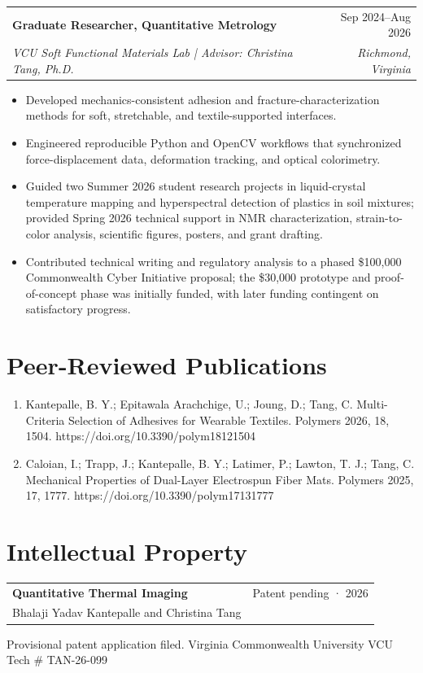 \documentclass[10pt,letterpaper]{article}
\makeatletter
\newcommand{\entry}[4]{%
  \begin{tabularx}{\textwidth}{@{}Xr@{}}
    {\bfseries\color{Ink} #1} & {\color{Muted}\small #2}\\
    {\itshape #3} & {\itshape\color{Muted}\small #4}
  \end{tabularx}\vspace{1pt}
}
\newcommand{\smallentry}[3]{%
  \begin{tabularx}{\textwidth}{@{}Xr@{}}
    {\bfseries #1} & {\color{Muted}\small #2}\\
    {\small #3} &
  \end{tabularx}\vspace{1pt}
}
\newcommand{\contactsep}{\hspace{0.45em}{\color{Rule}|}\hspace{0.45em}}
\makeatother
\begin{document}
\entry{Graduate Researcher, Quantitative Metrology}{Sep 2024–Aug 2026}{VCU Soft Functional Materials Lab | Advisor: Christina Tang, Ph.D.}{Richmond, Virginia}
\begin{itemize}
  \item Developed mechanics-consistent adhesion and fracture-characterization methods for soft, stretchable, and textile-supported interfaces.
  \item Engineered reproducible Python and OpenCV workflows that synchronized force-displacement data, deformation tracking, and optical colorimetry.
  \item Guided two Summer 2026 student research projects in liquid-crystal temperature mapping and hyperspectral detection of plastics in soil mixtures; provided Spring 2026 technical support in NMR characterization, strain-to-color analysis, scientific figures, posters, and grant drafting.
  \item Contributed technical writing and regulatory analysis to a phased \$100,000 Commonwealth Cyber Initiative proposal; the \$30,000 prototype and proof-of-concept phase was initially funded, with later funding contingent on satisfactory progress.
\end{itemize}


\section{Peer-Reviewed Publications}
\begin{enumerate}
  \item Kantepalle, B. Y.; Epitawala Arachchige, U.; Joung, D.; Tang, C. Multi-Criteria Selection of Adhesives for Wearable Textiles. Polymers 2026, 18, 1504. https://doi.org/10.3390/polym18121504
  \item Caloian, I.; Trapp, J.; Kantepalle, B. Y.; Latimer, P.; Lawton, T. J.; Tang, C. Mechanical Properties of Dual-Layer Electrospun Fiber Mats. Polymers 2025, 17, 1777. https://doi.org/10.3390/polym17131777
\end{enumerate}

\section{Intellectual Property}
\smallentry{Quantitative Thermal Imaging}{Patent pending · 2026}{Bhalaji Yadav Kantepalle and Christina Tang}
{\small Provisional patent application filed. Virginia Commonwealth University \contactsep VCU Tech \# TAN-26-099}
\end{document}
